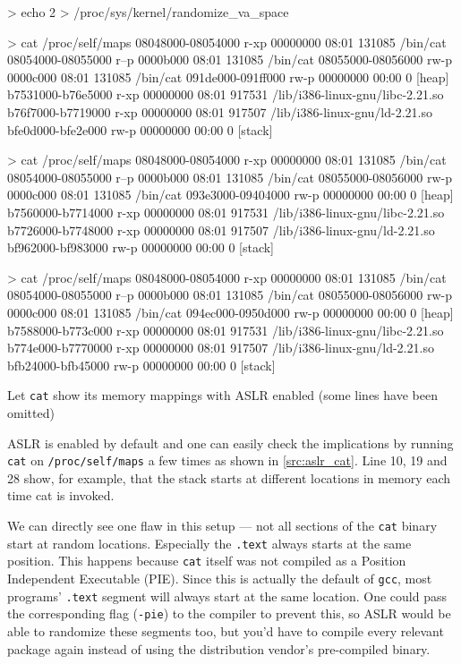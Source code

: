 \documentclass[article]{uibk}
\begin{document}
\begin{listing}[h!]
    \begin{code}
        > echo 2 > /proc/sys/kernel/randomize_va_space

        > cat /proc/self/maps
        08048000-08054000 r-xp 00000000 08:01 131085     /bin/cat
        08054000-08055000 r--p 0000b000 08:01 131085     /bin/cat
        08055000-08056000 rw-p 0000c000 08:01 131085     /bin/cat
        091de000-091ff000 rw-p 00000000 00:00 0          [heap]
        b7531000-b76e5000 r-xp 00000000 08:01 917531     /lib/i386-linux-gnu/libc-2.21.so
        b76f7000-b7719000 r-xp 00000000 08:01 917507     /lib/i386-linux-gnu/ld-2.21.so
        bfe0d000-bfe2e000 rw-p 00000000 00:00 0          [stack]

        > cat /proc/self/maps
        08048000-08054000 r-xp 00000000 08:01 131085     /bin/cat
        08054000-08055000 r--p 0000b000 08:01 131085     /bin/cat
        08055000-08056000 rw-p 0000c000 08:01 131085     /bin/cat
        093e3000-09404000 rw-p 00000000 00:00 0          [heap]
        b7560000-b7714000 r-xp 00000000 08:01 917531     /lib/i386-linux-gnu/libc-2.21.so
        b7726000-b7748000 r-xp 00000000 08:01 917507     /lib/i386-linux-gnu/ld-2.21.so
        bf962000-bf983000 rw-p 00000000 00:00 0          [stack]

        > cat /proc/self/maps
        08048000-08054000 r-xp 00000000 08:01 131085     /bin/cat
        08054000-08055000 r--p 0000b000 08:01 131085     /bin/cat
        08055000-08056000 rw-p 0000c000 08:01 131085     /bin/cat
        094ec000-0950d000 rw-p 00000000 00:00 0          [heap]
        b7588000-b773c000 r-xp 00000000 08:01 917531     /lib/i386-linux-gnu/libc-2.21.so
        b774e000-b7770000 r-xp 00000000 08:01 917507     /lib/i386-linux-gnu/ld-2.21.so
        bfb24000-bfb45000 rw-p 00000000 00:00 0          [stack]
    \end{code}
    \caption{Let \texttt{cat} show its memory mappings with ASLR enabled (some
lines have been omitted)}
    \label{src:aslr_cat}
\end{listing}

ASLR is enabled by default and one can easily check the implications by running
\texttt{cat} on \texttt{/proc/self/maps} a few times as shown in
\cref{src:aslr_cat}. Line 10, 19 and 28 show, for example, that the stack
starts at different locations in memory each time cat is invoked.

We can directly see one flaw in this setup --- not all sections of the
\texttt{cat} binary start at random locations. Especially the \texttt{.text}
always starts at the same position. This happens because \texttt{cat} itself
was not compiled as a Position Independent Executable (PIE). Since this is
actually the default of \texttt{gcc}, most programs' \texttt{.text} segment
will always start at the same location. One could pass the corresponding flag
(\texttt{-pie}) to the compiler to prevent this, so ASLR would be able to
randomize these segments too, but you'd have to compile every relevant package
again instead of using the distribution vendor's pre-compiled binary.
\end{document}

